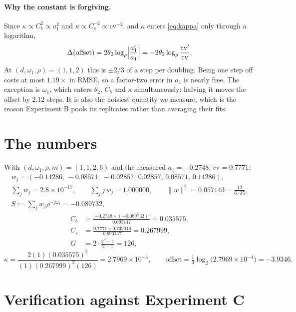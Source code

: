 \documentclass[11pt]{article}
\newcommand{\cv}{\mathrm{cv}}
\begin{document}
\paragraph{Why the constant is forgiving.}
Since $\kappa\propto C_b^2\propto a_1^2$ and $\kappa\propto C_s^{-2}\propto
\cv^{-2}$, and $\kappa$ enters \eqref{eq:kappa} only through a logarithm,
\begin{equation}
  \Delta(\text{offset})=2\theta_2\log_\rho\Bigl\lvert\frac{a_1'}{a_1}\Bigr\rvert
  =-2\theta_2\log_\rho\frac{\cv'}{\cv}.
\end{equation}
At $(d,\omega_1,\rho)=(1,1,2)$ this is $\pm 2/3$ of a step per doubling. Being
one step off costs at most $1.19\times$ in RMSE, so a factor-two error in $a_1$
is nearly free. The exception is $\omega_1$, which enters $\theta_2$, $C_b$ and
$\kappa$ simultaneously: halving it moves the offset by $2.12$ steps. It is
also the noisiest quantity we measure, which is the reason Experiment B pools
its replicates rather than averaging their fits.

\section{The numbers}

With $(d,\omega_1,\rho,m)=(1,1,2,6)$ and the measured $a_1=-0.2748$,
$\cv=0.7771$:
\begin{gather}
  w_j=(-0.14286,\,-0.08571,\,-0.02857,\,0.02857,\,0.08571,\,0.14286),\\
  \textstyle\sum_j w_j=2.8\times10^{-17},\qquad
  \sum_j j\,w_j=1.000000,\qquad
  \lVert w\rVert^2=0.057143=\tfrac{12}{6\cdot 35},\\
  S:=\textstyle\sum_j w_j\rho^{-j\omega_1}=-0.089732,
\end{gather}
\begin{align}
  C_b&=\frac{\lvert-0.2748\times(-0.089732)\rvert}{0.693147}=0.035575,\\
  C_s&=\frac{0.7771\times0.239046}{0.693147}=0.267999,\\
  G  &=2\cdot\frac{2^{6}-1}{2-1}=126,
\end{align}
\begin{equation}
  \kappa=\frac{2(1)(0.035575)^2}{(1)(0.267999)^2(126)}=2.7969\times10^{-4},
  \qquad
  \text{offset}=\tfrac13\log_2\bigl(2.7969\times10^{-4}\bigr)=-3.9346 .
\end{equation}

\section{Verification against Experiment C}
\end{document}
